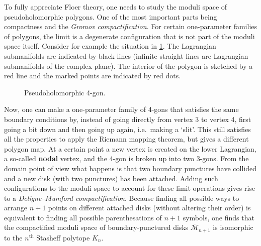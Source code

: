     \begin{property}
        To fully appreciate Floer theory, one needs to study the moduli space of pseudoholomorphic polygons. One of the most important parts being compactness and the \textit{Gromov compactification}. For certain one-parameter families of polygons, the limit is a degenerate configuration that is not part of the moduli space itself. Consider for example the situation in \cref{fig:floer_breaking}. The Lagrangian submanifolds are indicated by black lines (infinite straight lines are Lagrangian submanifolds of the complex plane). The interior of the polygon is sketched by a red line and the marked points are indicated by red dots.

        \begin{figure}[ht!]
            \centering
            \caption{Pseudoholomorphic 4-gon.}
            \label{fig:floer_breaking}
        \end{figure}
        Now, one can make a one-parameter family of 4-gons that satisfies the same boundary conditions by, instead of going directly from vertex 3 to vertex 4, first going a bit down and then going up again, i.e.~making a `slit'. This still satisfies all the properties to apply the Riemann mapping theorem, but gives a different polygon map. At a certain point a new vertex is created on the lower Lagrangian, a so-called \textbf{nodal} vertex, and the 4-gon is broken up into two 3-gons. From the domain point of view what happens is that two boundary punctures have collided and a new disk (with two punctures) has been attached. Adding such configurations to the moduli space to account for these limit operations gives rise to a \textit{Deligne--Mumford compactification}. Because finding all possible ways to arrange $n+1$ points on different attached disks (without altering their order) is equivalent to finding all possible parenthesations of $n+1$ symbols, one finds that the compactified moduli space of boundary-punctured disks $\overline{\mathcal{M}}_{n+1}$ is isomorphic to the $n^{\text{th}}$ Stasheff polytope $K_n$.


\end{property}
